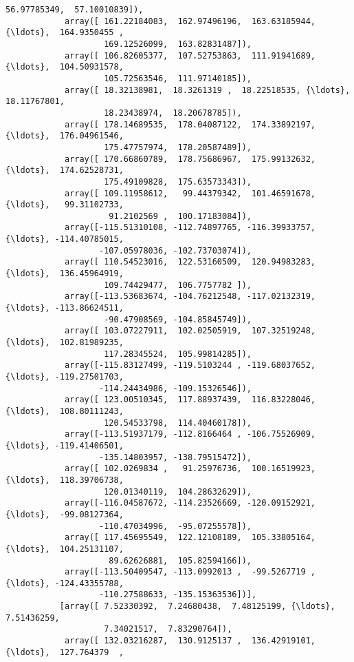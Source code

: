 \documentclass[11pt]{article}
\begin{document}
\begin{Verbatim}[commandchars=\\\{\}]
                    56.97785349,  57.10010839]),
            array([ 161.22184083,  162.97496196,  163.63185944, {\ldots},  164.9350455 ,
                    169.12526099,  163.82831487]),
            array([ 106.82605377,  107.52753863,  111.91941689, {\ldots},  104.50931578,
                    105.72563546,  111.97140185]),
            array([ 18.32138981,  18.3261319 ,  18.22518535, {\ldots},  18.11767801,
                    18.23438974,  18.20678785]),
            array([ 178.14689535,  178.04087122,  174.33892197, {\ldots},  176.04961546,
                    175.47757974,  178.20587489]),
            array([ 170.66860789,  178.75686967,  175.99132632, {\ldots},  174.62528731,
                    175.49109828,  175.63573343]),
            array([ 109.11958612,   99.44379342,  101.46591678, {\ldots},   99.31102733,
                     91.2102569 ,  100.17183084]),
            array([-115.51310108, -112.74897765, -116.39933757, {\ldots}, -114.40785015,
                   -107.05978036, -102.73703074]),
            array([ 110.54523016,  122.53160509,  120.94983283, {\ldots},  136.45964919,
                    109.74429477,  106.7757782 ]),
            array([-113.53683674, -104.76212548, -117.02132319, {\ldots}, -113.86624511,
                    -90.47908569, -104.85845749]),
            array([ 103.07227911,  102.02505919,  107.32519248, {\ldots},  102.81989235,
                    117.28345524,  105.99814285]),
            array([-115.83127499, -119.5103244 , -119.68037652, {\ldots}, -119.27501703,
                   -114.24434986, -109.15326546]),
            array([ 123.00510345,  117.88937439,  116.83228046, {\ldots},  108.80111243,
                    120.54533798,  114.40460178]),
            array([-113.51937179, -112.8166464 , -106.75526909, {\ldots}, -119.41406501,
                   -135.14803957, -138.79515472]),
            array([ 102.0269834 ,   91.25976736,  100.16519923, {\ldots},  118.39706738,
                    120.01340119,  104.28632629]),
            array([-116.04587672, -114.23526669, -120.09152921, {\ldots},  -99.08127364,
                   -110.47034996,  -95.07255578]),
            array([ 117.45695549,  122.12108189,  105.33805164, {\ldots},  104.25131107,
                     89.62626881,  105.82594166]),
            array([-113.50409547, -113.0992013 ,  -99.5267719 , {\ldots}, -124.43355788,
                   -110.27588633, -135.15363536])],
           [array([ 7.52330392,  7.24680438,  7.48125199, {\ldots},  7.51436259,
                    7.34021517,  7.83290764]),
            array([ 132.03216287,  130.9125137 ,  136.42919101, {\ldots},  127.764379  ,

\end{Verbatim}
\end{document}
